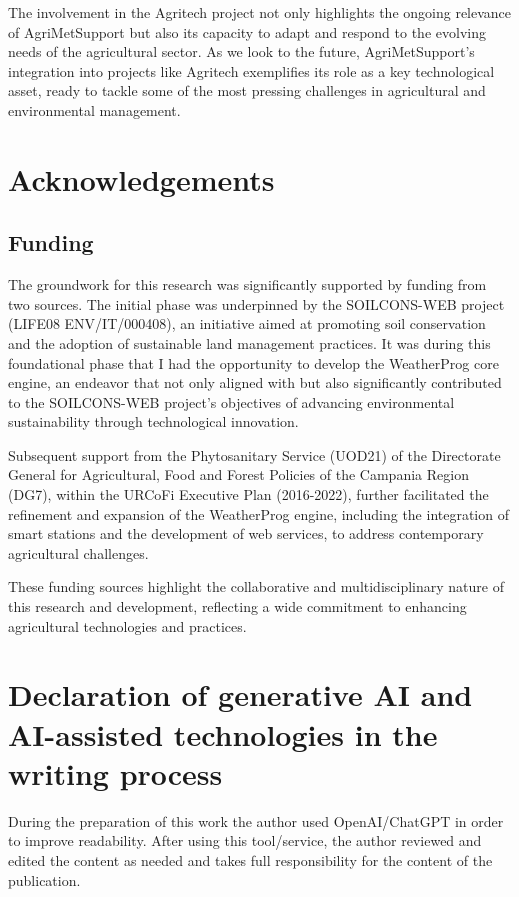 \documentclass[authoryear,preprint,review,12pt]{elsarticle}
\begin{document}
The involvement in the Agritech project not only highlights the ongoing relevance of Agri\-Met\-Support but also its capacity to adapt and respond to the evolving needs of the agricultural sector. 
As we look to the future, Agri\-Met\-Support's integration into projects like Agritech exemplifies its role as a key technological asset, ready to tackle some of the most pressing challenges in agricultural and environmental management.

\section*{Acknowledgements}
\subsection*{Funding}
The groundwork for this research was significantly supported by funding from two sources. 
The initial phase was underpinned by the SOILCONS-WEB project (LIFE08 ENV/IT/000408), an initiative aimed at promoting soil conservation and the adoption of sustainable land management practices. 
It was during this foundational phase that I had the opportunity to develop the WeatherProg core engine, an endeavor that not only aligned with but also significantly contributed to the SOILCONS-WEB project's objectives of advancing environmental sustainability through technological innovation.

Subsequent support from the Phytosanitary Service (UOD21) of the Directorate General for Agricultural, Food and Forest Policies of the Campania Region (DG7), within the URCoFi Executive Plan (2016-2022), further facilitated the refinement and expansion of the WeatherProg engine, including the integration of smart stations and the development of web services, to address contemporary agricultural challenges.

These funding sources highlight the collaborative and multidisciplinary nature of this research and development, reflecting a wide commitment to enhancing agricultural technologies and practices.%


\section{Declaration of generative AI and AI-assisted technologies in the writing process}
During the preparation of this work the author used OpenAI/ChatGPT in order to improve readability. 
After using this tool/service, the author reviewed and edited the content as needed and takes full responsibility for the content of the publication.
\end{document}
